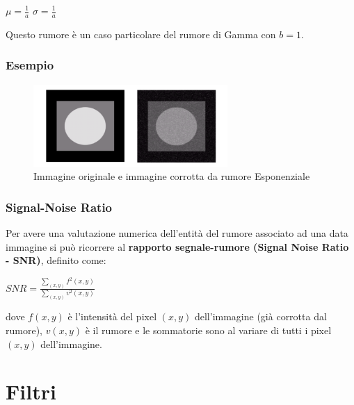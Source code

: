 
\begin{center}
    $\mu = \frac{1}{a}$ $\sigma = \frac{1}{a}$
\end{center}

Questo rumore è un caso particolare del rumore di Gamma con $b = 1$.

\subsubsection{Esempio}

\begin{figure}[H]
    \centering
    \includegraphics[width=\linewidth, keepaspectratio]{capitoli/immagini/imgs/esempio-esponenziale.png}
    \caption*{Immagine originale e immagine corrotta da rumore Esponenziale}
\end{figure}

\subsubsection{Signal-Noise Ratio}

Per avere una valutazione numerica dell'entità del rumore associato ad una data immagine si può ricorrere al \textbf{rapporto segnale-rumore
    (Signal Noise Ratio - SNR)}, definito come:

\begin{center}
    $
        SNR = \frac{\sum_{(x,y)}^{}f^2(x,y)}{\sum_{(x,y)}^{}v^2(x,y)}
    $
\end{center}

dove $f(x, y)$ è l'intensità del pixel $(x, y)$ dell'immagine (già corrotta dal rumore), $v(x, y)$ è il rumore e le sommatorie sono al
variare di tutti i pixel $(x, y)$ dell'immagine.

\section{Filtri}

